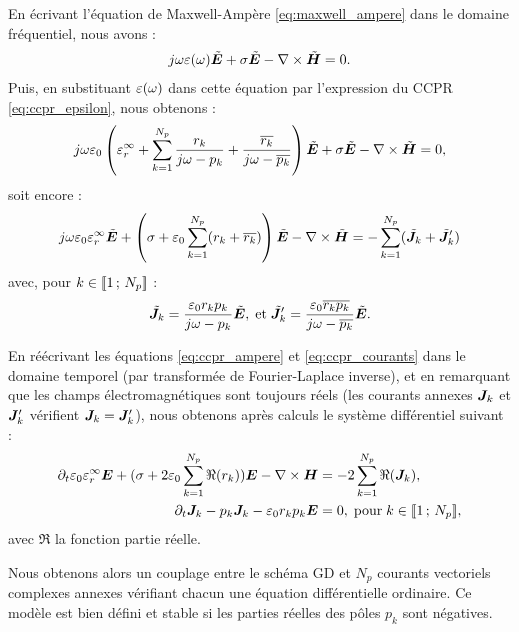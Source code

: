 En écrivant l'équation de Maxwell-Ampère \eqref{eq:maxwell_ampere} dans le domaine
fréquentiel, nous avons :
\begin{align}
j \omega \varepsilon(\omega) \tilde{\bm{E}} +
\sigma \tilde{\bm{E}} - \nabla\times \tilde{\bm{H}} = 0 .
\end{align}
Puis, en substituant $\varepsilon(\omega)$ dans cette équation par
l'expression du CCPR \eqref{eq:ccpr_epsilon}, nous obtenons :
\begin{align}
j \omega \varepsilon_0 \left(\varepsilon_r^\infty + 
\sum_{k = 1}^{N_p} \frac{r_k}{j \omega - p_k} +
\frac{\overline{r_k}}{j \omega - \overline{p_k}}\right)
\tilde{\bm{E}} + \sigma \tilde{\bm{E}} - \nabla\times \tilde{\bm{H}} = 0 ,
\end{align}
soit encore :
\begin{align}
j \omega \varepsilon_0 \varepsilon_r^\infty \tilde{\bm{E}} + \left(\sigma +
\varepsilon_0 \sum_{k = 1}^{N_p} (r_k + \overline{r_k})\right) \tilde{\bm{E}} - \nabla\times
\tilde{\bm{H}} = - \sum_{k = 1}^{N_p} (\tilde{\bm{J}}_k + \tilde{\bm{J}}'_k)
\label{eq:ccpr_ampere}
\end{align}
avec, pour $k \in \lbrack\!\lbrack1\,;\,N_p\rbrack\!\rbrack$ :
\begin{align}
\tilde{\bm{J}}_k = \frac{\varepsilon_0 r_k p_k}{j \omega - p_k} \tilde{\bm{E}} ,
\; \mathrm{et} \;
\tilde{\bm{J}}'_k = \frac{\varepsilon_0 \overline{r_k} \overline{p_k}}{j \omega - \overline{p_k}} \tilde{\bm{E}}
\label{eq:ccpr_courants} .
\end{align}

En réécrivant les équations \eqref{eq:ccpr_ampere} et \eqref{eq:ccpr_courants}
dans le domaine temporel (par transformée de Fourier-Laplace inverse), et
en remarquant que les champs électromagnétiques sont toujours réels
(les courants annexes $\bm{J}_k$ et $\bm{J}'_k$ vérifient $\bm{J}_k = \bm{J}'_k$),
nous obtenons après calculs le système différentiel suivant :
\begin{subequations}
	\begin{align}
	\partial_{t} \varepsilon_0 \varepsilon_r^\infty \bm{E} + (\sigma +
	2 \varepsilon_0 \sum_{k = 1}^{N_p} \Re(r_k)) \bm{E} - \nabla\times
	\bm{H} &= - 2 \sum_{k = 1}^{N_p} \Re(\bm{J}_k) ,
	\\
	\partial_{t} \bm{J}_k - p_k \bm{J}_k - \varepsilon_0 r_k p_k \bm{E} &= 0, \; \mathrm{pour} \;
	k \in \lbrack\!\lbrack1\,;\,N_p\rbrack\!\rbrack ,
	\end{align}
\end{subequations}
avec $\Re$ la fonction partie réelle.

Nous obtenons alors un couplage entre le schéma GD et $N_p$
courants vectoriels complexes annexes vérifiant chacun une
équation différentielle ordinaire.
Ce modèle est bien défini et stable si les parties réelles des pôles $p_k$
sont négatives.
\\



